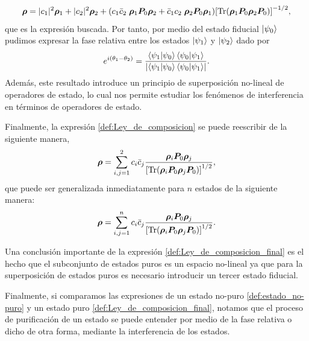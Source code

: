 \documentclass[../Main.tex]{subfiles}
\begin{document}
\begin{equation}
    \bm{\rho} = |c_1|^2\bm{\rho}_1+|c_2|^2\bm{\rho}_2
    +\qty(c_1\bar{c}_2\;\bm{\rho}_1\bm{P}_0\bm{\rho}_2+\bar{c}_1c_2\;\bm{\rho}_2\bm{P}_0\bm{\rho}_1)\qty[\Tr(\bm{\rho}_1\bm{P}_0\bm{\rho}_2\bm{P}_0)]^{-1/2},
    \label{def:Ley_de_composicion}
\end{equation}
que es la expresión buscada. Por tanto, por medio del estado fiducial $\ket{\psi_0}$ pudimos expresar la fase relativa entre los estados $\ket{\psi_1}$ y $\ket{\psi_2}$ dado por
\begin{equation}
     e^{i(\theta_1-\theta_2)}=\frac{\ip{\psi_1}{\psi_0}\ip{\psi_0}{\psi_1}}{\abs{\ip{\psi_1}{\psi_0}\ip{\psi_0}{\psi_1}}}.
\end{equation}
Además, este resultado introduce un principio de superposición no-lineal de operadores de estado, lo cual nos permite estudiar los fenómenos de interferencia en términos de operadores de estado.


Finalmente, la expresión \eqref{def:Ley_de_composicion} se puede reescribir de la siguiente manera,
\begin{equation}
    \bm{\rho}=\sum_{i,j=1}^2c_i\bar{c}_j\frac{\bm{\rho}_i\bm{P}_0\bm{\rho}_j}{\qty[\Tr(\bm{\rho}_i\bm{P}_0\bm{\rho}_j\bm{P}_0)]^{1/2}},
\end{equation}
que puede ser generalizada inmediatamente para $n$ estados de la siguiente manera:
\begin{equation}
    \bm{\rho} = \sum_{i,j=1}^nc_i\bar{c}_j\frac{\bm{\rho}_i\bm{P}_0\bm{\rho}_j}{\qty[\Tr(\bm{\rho}_i\bm{P}_0\bm{\rho}_j\bm{P}_0)]^{1/2}}.
    \label{def:Ley_de_composicion_final}
\end{equation}

Una conclusión importante de la expresión \eqref{def:Ley_de_composicion_final} es el hecho que el subconjunto de estados puros es un espacio no-lineal ya que para la superposición de estados puros es necesario introducir un tercer estado fiducial.

Finalmente, si comparamos las expresiones de un estado no-puro \eqref{def:estado_no-puro} y un estado puro \eqref{def:Ley_de_composicion_final}, notamos que el proceso de purificación de un estado se puede entender por medio de la fase relativa o dicho de otra forma, mediante la interferencia de los estados.
\end{document}
